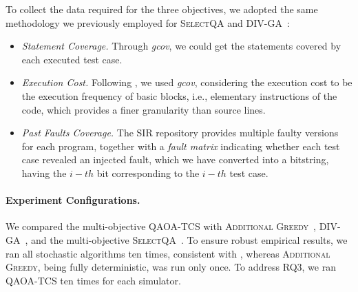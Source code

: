 To collect the data required for the three objectives, we adopted the same methodology we previously employed for \textsc{SelectQA} and \textsc{DIV-GA}~\citep{selectqa,panichella2014improving}:

\begin{itemize}
\item \textit{Statement Coverage.} Through \textit{gcov}, we could get the statements covered by each executed test case.

\item \textit{Execution Cost.} Following \citet{panichella2014improving}, we used \textit{gcov}, considering the execution cost to be the execution frequency of basic blocks, i.e., elementary instructions of the code, which provides a finer granularity than source lines.

\item \textit{Past Faults Coverage.} The SIR repository provides multiple faulty versions for each program, together with a \textit{fault matrix} indicating whether each test case revealed an injected fault, which we have converted into a bitstring, having the $i-th$ bit corresponding to the $i-th$ test case.
\end{itemize}

\paragraph{Experiment Configurations.}
\label{4.2.2}
We compared the multi-objective \textsc{QAOA-TCS} with \textsc{Additional Greedy}~\citep{yoo2007pareto}, \textsc{DIV-GA}~\citep{panichella2014improving}, and the multi-objective \textsc{SelectQA}~\citep{selectqa}.
To ensure robust empirical results, we ran all stochastic algorithms ten times, consistent with \citet{bootqa,selectqa}, whereas \textsc{Additional Greedy}, being fully deterministic, was run only once.
To address RQ3, we ran \textsc{QAOA-TCS} ten times for each simulator.

